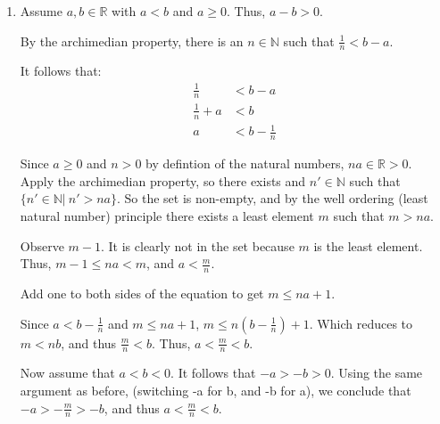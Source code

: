 \documentclass{article}
\theoremstyle{problem}
\theoremstyle{plain}
\theoremstyle{remark}
\begin{document}
\begin{enumerate}
\item 
  Assume $a,b \in \mathbb{R}$ with $a < b$ and $a \geq 0$. Thus, $a - b > 0$.

  By the archimedian property, there is an $n \in \mathbb{N}$ such that $\frac{1}{n} < b - a$.

  It follows that:
  \begin{align*}
    \frac{1}{n} &< b - a\\
    \frac{1}{n} + a &< b\\
    a &< b - \frac{1}{n}
  \end{align*}

  Since $a \geq 0$ and $n > 0$ by defintion of the natural numbers, $na \in \mathbb{R} > 0$.  
  Apply the archimedian property, so there exists and $n' \in \mathbb{N}$ such that $\{n' \in \mathbb{N}|\ n' > na \}$.
  So the set is non-empty, and by the well ordering (least natural number) principle there exists a least element $m$ such that $m > na$.

  Observe $m - 1$. It is clearly not in the set because $m$ is the least element.
  Thus, $m - 1 \leq na < m$, and $a < \frac{m}{n}$.

  Add one to both sides of the equation to get $m \leq na + 1$.

  Since $a < b - \frac{1}{n}$ and $m \leq na + 1$, $m \leq n(b - \frac{1}{n}) + 1$.
  Which reduces to $m < nb$, and thus $\frac{m}{n} < b$.
  Thus, $a < \frac{m}{n} < b$.

  Now assume that $a < b < 0$.
  It follows that $-a > -b > 0$.
  Using the same argument as before, (switching -a for b, and -b for a), we conclude that $-a > -\frac{m}{n} > -b$, and thus $a < \frac{m}{n} < b$.
  

\end{enumerate}
\end{document}
